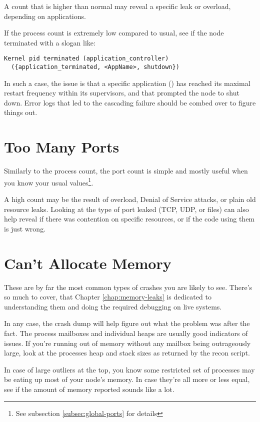 A count that is higher than normal may reveal a specific leak or overload, depending on applications.

If the process count is extremely low compared to usual, see if the node terminated with a slogan like:

\begin{Verbatim}
Kernel pid terminated (application_controller)
  ({application_terminated, <AppName>, shutdown})
\end{Verbatim}

In such a case, the issue is that a specific application () has reached its maximal restart frequency within its supervisors, and that prompted the node to shut down. Error logs that led to the cascading failure should be combed over to figure things out.

\section{Too Many Ports}

Similarly to the process count, the port count is simple and mostly useful when you know your usual values\footnote{See subsection \ref{subsec:global-ports} for details}.

A high count may be the result of overload, Denial of Service attacks, or plain old resource leaks. Looking at the type of port leaked (TCP, UDP, or files) can also help reveal if there was contention on specific resources, or if the code using them is just wrong.

\section{Can't Allocate Memory}

These are by far the most common types of crashes you are likely to see. There's so much to cover, that Chapter \ref{chap:memory-leaks} is dedicated to understanding them and doing the required debugging on live systems.

In any case, the crash dump will help figure out what the problem was after the fact. The process mailboxes and individual heaps are usually good indicators of issues. If you're running out of memory without any mailbox being outrageously large, look at the processes heap and stack sizes as returned by the recon script.

In case of large outliers at the top, you know some restricted set of processes may be eating up most of your node's memory. In case they're all more or less equal, see if the amount of memory reported sounds like a lot.

